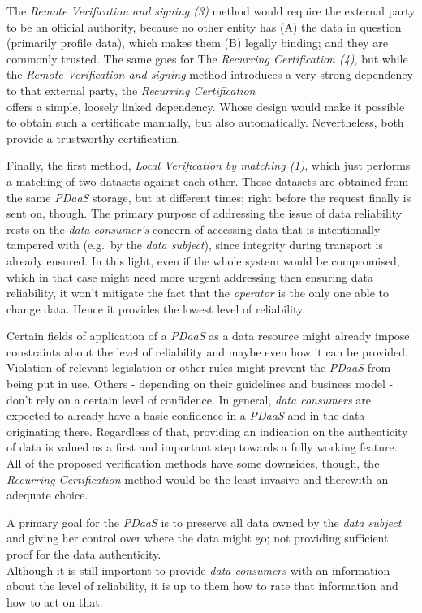 \documentclass[12pt,english,a4paper,titlepage,cleardoublepage=empty,dottedtoc]{report}
\begin{document}
The \emph{Remote Verification and signing (3)} method would require the
external party to be an official authority, because no other entity has
(A) the data in question (primarily profile data), which makes them (B)
legally binding; and they are commonly trusted. The same goes for The
\emph{Recurring Certification (4)}, but while the \emph{Remote
Verification and signing} method introduces a very strong dependency to
that external party, the \emph{Recurring Certification}\\
offers a simple, loosely linked dependency. Whose design would make it
possible to obtain such a certificate manually, but also automatically.
Nevertheless, both provide a trustworthy certification.

Finally, the first method, \emph{Local Verification by matching (1)},
which just performs a matching of two datasets against each other. Those
datasets are obtained from the same \emph{PDaaS} storage, but at
different times; right before the request finally is sent on, though.
The primary purpose of addressing the issue of data reliability rests on
the \emph{data consumer's} concern of accessing data that is
intentionally tampered with (e.g.~by the \emph{data subject}), since
integrity during transport is already ensured. In this light, even if
the whole system would be compromised, which in that case might need
more urgent addressing then ensuring data reliability, it won't mitigate
the fact that the \emph{operator} is the only one able to change data.
Hence it provides the lowest level of reliability.

Certain fields of application of a \emph{PDaaS} as a data resource might
already impose constraints about the level of reliability and maybe even
how it can be provided. Violation of relevant legislation or other rules
might prevent the \emph{PDaaS} from being put in use. Others - depending
on their guidelines and business model - don't rely on a certain level
of confidence. In general, \emph{data consumers} are expected to already
have a basic confidence in a \emph{PDaaS} and in the data originating
there. Regardless of that, providing an indication on the authenticity
of data is valued as a first and important step towards a fully working
feature. All of the proposed verification methods have some downsides,
though, the \emph{Recurring Certification} method would be the least
invasive and therewith an adequate choice.

A primary goal for the \emph{PDaaS} is to preserve all data owned by the
\emph{data subject} and giving her control over where the data might go;
not providing sufficient proof for the data authenticity.\\
Although it is still important to provide \emph{data consumers} with an
information about the level of reliability, it is up to them how to rate
that information and how to act on that.
\end{document}
